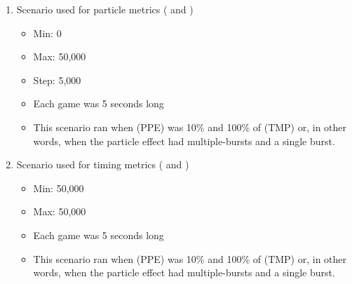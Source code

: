 \begin{enumerate}[nolistsep,topsep=2pt]

	\item Scenario used for particle metrics ( and )
	\begin{itemize}[nolistsep,topsep=0pt]
		\item Min: 0
		\item Max: 50,000
		\item Step: 5,000
		\item Each game was 5 seconds long
		\item This scenario ran when  (PPE) was 10\% and 100\% of  (TMP) or, in other words, when the particle effect had multiple-bursts and a single burst.
	\end{itemize}

	\item Scenario used for timing metrics ( and )
	\begin{itemize}[nolistsep,topsep=0pt]
		\item Min: 50,000
		\item Max: 50,000
		\item Each game was 5 seconds long
		\item This scenario ran when  (PPE) was 10\% and 100\% of  (TMP) or, in other words, when the particle effect had multiple-bursts and a single burst.
	\end{itemize}

\end{enumerate}

